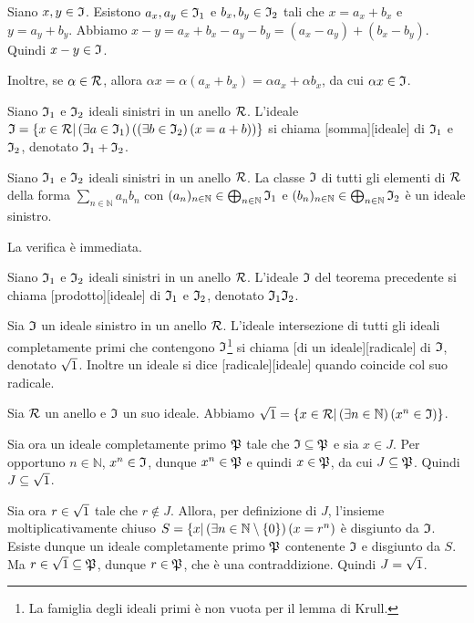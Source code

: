 \Proof Siano $x, y \in \mathfrak{I}$. Esistono $a_x, a_y \in \mathfrak{I}_1$ e $b_x, b_y \in \mathfrak{I}_2$ tali che $x = a_x + b_x$ e $y = a_y + b_y$. Abbiamo $x - y = a_x + b_x - a_y - b_y = (a_x - a_y) + (b_x - b_y)$. Quindi $x - y \in \mathfrak{I}$.
\par Inoltre, se $\alpha \in \mathcal{R}$, allora $\alpha x = \alpha(a_x + b_x) = \alpha a_x + \alpha b_x$, da cui $\alpha x \in \mathfrak{I}$. \EndProof
\begin{Definition}
	Siano $\mathfrak{I}_1$ e $\mathfrak{I}_2$ ideali sinistri in un anello $\mathcal{R}$. L'ideale $\mathfrak{I} = \lbrace x \in \mathcal{R} | \left ( \exists a \in \mathfrak{I}_1 \right ) \left ( \left ( \exists b \in \mathfrak{I}_2 \right ) \left ( x = a + b \right ) \right ) \rbrace$ si chiama [somma][ideale] di $\mathfrak{I}_1$ e $\mathfrak{I}_2$, denotato $\mathfrak{I}_1 + \mathfrak{I}_2$.
\end{Definition}
\begin{Theorem}
	Siano $\mathfrak{I}_1$ e $\mathfrak{I}_2$ ideali sinistri in un anello $\mathcal{R}$. La classe $\mathfrak{I}$ di tutti gli elementi di $\mathcal{R}$ della forma $\sum_{n \in \mathbb{N}} a_nb_n$ con $(a_n)_{n \in \mathbb{N}} \in \bigoplus_{n \in \mathbb{N}} \mathfrak{I}_1$ e $(b_n)_{n \in \mathbb{N}} \in \bigoplus_{n \in \mathbb{N}} \mathfrak{I}_2$ \`e un ideale sinistro.
\end{Theorem}
\Proof La verifica \`e immediata.
\begin{Definition}
	Siano $\mathfrak{I}_1$ e $\mathfrak{I}_2$ ideali sinistri in un anello $\mathcal{R}$. L'ideale $\mathfrak{I}$ del teorema precedente si chiama [prodotto][ideale] di $\mathfrak{I}_1$ e $\mathfrak{I}_2$, denotato $\mathfrak{I}_1\mathfrak{I}_2$.
\end{Definition}
\begin{Definition}
	Sia $\mathfrak{I}$ un ideale sinistro in un anello $\mathcal{R}$. L'ideale intersezione di tutti gli ideali completamente primi che contengono $\mathfrak{I}$\footnote{La famiglia degli ideali primi \`e non vuota per il lemma di Krull.} si chiama [di un ideale][radicale] di $\mathfrak{I}$, denotato $\sqrt{1}$. Inoltre un ideale si dice [radicale][ideale] quando coincide col suo radicale.
\end{Definition}
\begin{Theorem}
	Sia $\mathcal{R}$ un anello e $\mathfrak{I}$ un suo ideale. Abbiamo $\sqrt{1} = \lbrace x \in \mathcal{R} | \left ( \exists n \in \mathbb{N} \right ) \left ( x^n \in \mathfrak{I} \right ) \rbrace$.
\end{Theorem}
\Proof Sia ora un ideale completamente primo $\mathfrak{P}$ tale che $\mathfrak{I} \subseteq \mathfrak{P}$ e sia $x \in J$. Per opportuno $n \in \mathbb{N}$, $x^n \in \mathfrak{I}$, dunque $x^n \in \mathfrak{P}$ e quindi $x \in \mathfrak{P}$, da cui $J \subseteq \mathfrak{P}$. Quindi $J \subseteq \sqrt{1}$.
\par Sia ora $r \in \sqrt{1}$ tale che $r \notin J$. Allora, per definizione di $J$, l'insieme moltiplicativamente chiuso $S = \lbrace x | \left ( \exists n \in \mathbb{N} \setminus \lbrace 0 \rbrace \right ) \left ( x = r^n \right )$ \`e disgiunto da $\mathfrak{I}$. Esiste dunque un ideale completamente primo $\mathfrak{P}$ contenente $\mathfrak{I}$ e disgiunto da $S$. Ma $r \in \sqrt{1} \subseteq \mathfrak{P}$, dunque $r \in \mathfrak{P}$, che \`e una contraddizione. Quindi $J = \sqrt{1}$. \EndProof
